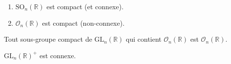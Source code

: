   \begin{proposition}
    \begin{enumerate}[label={\bfseries(\roman*)}]
      \item $\mathrm{SO}_n(\mathbb{R})$ est compact (et connexe).
      \item $\mathcal{O}_n(\mathbb{R})$ est compact (non-connexe).
    \end{enumerate}
  \end{proposition}


  \begin{proposition}
    Tout sous-groupe compact de $\mathrm{GL}_n(\mathbb{R})$ qui contient $\mathcal{O}_n(\mathbb{R})$ est $\mathcal{O}_n(\mathbb{R})$.
  \end{proposition}


  \begin{proposition}
    $\mathrm{GL}_n(\mathbb{R})^+$ est connexe.
  \end{proposition}

